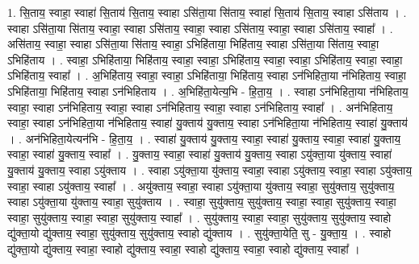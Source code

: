 \documentclass[17pt]{extarticle}
\begin{document}
1. सि॒ताय॒ स्वाहा॒ स्वाहा॑ सि॒ताय॑ सि॒ताय॒ स्वाहा ऽसि॑ता॒या सि॑ताय॒ स्वाहा॑ सि॒ताय॑ सि॒ताय॒ स्वाहा ऽसि॑ताय । . स्वाहा ऽसि॑ता॒या सि॑ताय॒ स्वाहा॒ स्वाहा ऽसि॑ताय॒ स्वाहा॒ स्वाहा ऽसि॑ताय॒ स्वाहा॒ स्वाहा ऽसि॑ताय॒ स्वाहा᳚ । . असि॑ताय॒ स्वाहा॒ स्वाहा ऽसि॑ता॒या सि॑ताय॒ स्वाहा॒ ऽभिहि॑ताया॒ भिहि॑ताय॒ स्वाहा ऽसि॑ता॒या सि॑ताय॒ स्वाहा॒ ऽभिहि॑ताय । . स्वाहा॒ ऽभिहि॑ताया॒ भिहि॑ताय॒ स्वाहा॒ स्वाहा॒ ऽभिहि॑ताय॒ स्वाहा॒ स्वाहा॒ ऽभिहि॑ताय॒ स्वाहा॒ स्वाहा॒ ऽभिहि॑ताय॒ स्वाहा᳚ । . अ॒भिहि॑ताय॒ स्वाहा॒ स्वाहा॒ ऽभिहि॑ताया॒ भिहि॑ताय॒ स्वाहा ऽन॑भिहिता॒या न॑भिहिताय॒ स्वाहा॒ ऽभिहि॑ताया॒ भिहि॑ताय॒ स्वाहा ऽन॑भिहिताय । . अ॒भिहि॑ता॒येत्य॒भि - हि॒ता॒य॒ । . स्वाहा ऽन॑भिहिता॒या न॑भिहिताय॒ स्वाहा॒ स्वाहा ऽन॑भिहिताय॒ स्वाहा॒ स्वाहा ऽन॑भिहिताय॒ स्वाहा॒ स्वाहा ऽन॑भिहिताय॒ स्वाहा᳚ । . अन॑भिहिताय॒ स्वाहा॒ स्वाहा ऽन॑भिहिता॒या न॑भिहिताय॒ स्वाहा॑ यु॒क्ताय॑ यु॒क्ताय॒ स्वाहा ऽन॑भिहिता॒या न॑भिहिताय॒ स्वाहा॑ यु॒क्ताय॑ । . अन॑भिहिता॒येत्यन॑भि - हि॒ता॒य॒ । . स्वाहा॑ यु॒क्ताय॑ यु॒क्ताय॒ स्वाहा॒ स्वाहा॑ यु॒क्ताय॒ स्वाहा॒ स्वाहा॑ यु॒क्ताय॒ स्वाहा॒ स्वाहा॑ यु॒क्ताय॒ स्वाहा᳚ । . यु॒क्ताय॒ स्वाहा॒ स्वाहा॑ यु॒क्ताय॑ यु॒क्ताय॒ स्वाहा ऽयु॑क्ता॒या यु॑क्ताय॒ स्वाहा॑ यु॒क्ताय॑ यु॒क्ताय॒ स्वाहा ऽयु॑क्ताय । . स्वाहा ऽयु॑क्ता॒या यु॑क्ताय॒ स्वाहा॒ स्वाहा ऽयु॑क्ताय॒ स्वाहा॒ स्वाहा ऽयु॑क्ताय॒ स्वाहा॒ स्वाहा ऽयु॑क्ताय॒ स्वाहा᳚ । . अयु॑क्ताय॒ स्वाहा॒ स्वाहा ऽयु॑क्ता॒या यु॑क्ताय॒ स्वाहा॒ सुयु॑क्ताय॒ सुयु॑क्ताय॒ स्वाहा ऽयु॑क्ता॒या यु॑क्ताय॒ स्वाहा॒ सुयु॑क्ताय । . स्वाहा॒ सुयु॑क्ताय॒ सुयु॑क्ताय॒ स्वाहा॒ स्वाहा॒ सुयु॑क्ताय॒ स्वाहा॒ स्वाहा॒ सुयु॑क्ताय॒ स्वाहा॒ स्वाहा॒ सुयु॑क्ताय॒ स्वाहा᳚ । . सुयु॑क्ताय॒ स्वाहा॒ स्वाहा॒ सुयु॑क्ताय॒ सुयु॑क्ताय॒ स्वाहो द्यु॑क्ता॒यो द्यु॑क्ताय॒ स्वाहा॒ सुयु॑क्ताय॒ सुयु॑क्ताय॒ स्वाहो द्यु॑क्ताय । . सुयु॑क्ता॒येति॒ सु - यु॒क्ता॒य॒ । . स्वाहो द्यु॑क्ता॒यो द्यु॑क्ताय॒ स्वाहा॒ स्वाहो द्यु॑क्ताय॒ स्वाहा॒ स्वाहो द्यु॑क्ताय॒ स्वाहा॒ स्वाहो द्यु॑क्ताय॒ स्वाहा᳚ । \newline
\end{document}

